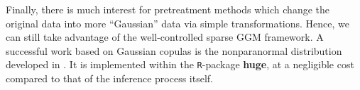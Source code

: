 Finally, there is much interest  for pretreatment methods which change
the   original   data  into   more   ``Gaussian''   data  via   simple
transformations.   Hence,   we  can   still  take  advantage   of  the
well-controlled  sparse GGM  framework.   A successful  work based  on
Gaussian  copulas  is  the  nonparanormal  distribution  developed  in
\cite{liu2009nonparanormal}.    It    is   implemented    within   the
\texttt{R}-package  \textbf{huge}, at  a negligible  cost compared  to
that of the inference process itself.

